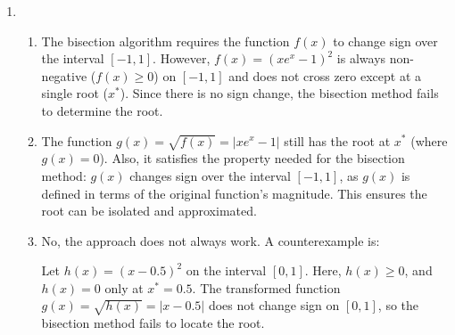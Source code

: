 \documentclass[12pt]{article}
\begin{document}
\begin{enumerate}
\begin{enumerate}
\end{enumerate}

\item 
\begin{enumerate}

\item 
The bisection algorithm requires the function $f(x)$ to change sign over the interval $[-1, 1]$. However, $f(x) = (x e^x - 1)^2$ is always non-negative ($f(x) \geq 0$) on $[-1, 1]$ and does not cross zero except at a single root ($x^*$). Since there is no sign change, the bisection method fails to determine the root.

\item   
The function $g(x) = \sqrt{f(x)} = |x e^x - 1|$ still has the root at $x^*$ (where $g(x) = 0$). Also, it satisfies the property needed for the bisection method: $g(x)$ changes sign over the interval $[-1, 1]$, as $g(x)$ is defined in terms of the original function's magnitude. This ensures the root can be isolated and approximated.

\item 
No, the approach does not always work. A counterexample is:

Let \( h(x) = (x - 0.5)^2 \) on the interval \([0, 1]\).  
Here, \( h(x) \geq 0 \), and \( h(x) = 0 \) only at \( x^* = 0.5 \). The transformed function \( g(x) = \sqrt{h(x)} = |x - 0.5| \) does not change sign on \([0, 1]\), so the bisection method fails to locate the root.


\end{enumerate}

\end{enumerate}
\end{document}
